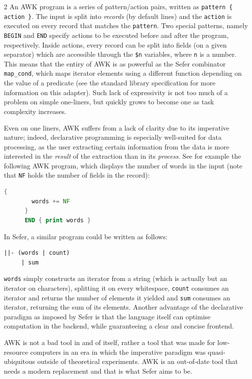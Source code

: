 \begin{multicols*}{2}
  An AWK program is a series of pattern/action pairs, written as
  \verb|pattern { action }|. The input is split into \emph{records}
  (by default lines) and the \verb|action| is executed on every record
  that matches the \verb|pattern|. Two special patterns, namely
  \verb|BEGIN| and \verb|END| specify actions to be executed before
  and after the program, respectively. Inside actions, every record
  can be split into fields (on a given separator) which are accessible
  through the \verb|$n| variables, where \verb|n| is a number. This
  means that the entiry of AWK is as powerful as the Sefer combinator
  \verb|map_cond|, which maps iterator elements using a different
  function depending on the value of a predicate (see the standard
  library specification for more information on this adapter). Such
  lack of expressivity is not too much of a problem on simple
  one-liners, but quickly grows to become one as task complexity
  increases.

  Even on one liners, AWK suffers from a lack of clarity due to its
  imperative nature; indeed, declarative programming is especially
  well-suited for data processing, as the user extracting certain
  information from the data is more interested in the \emph{result} of
  the extraction than in its \emph{process}. See for example the
  following AWK program, which displays the number of words in the
  input (note that \verb|NF| holds the number of fields in the record):
  \begin{lstlisting}[language=Awk,caption={\texttt{wc -w} as an AWK
        program}]
      {
        words += NF
      }
      END { print words }
    \end{lstlisting}

  In Sefer, a similar program could be written as follows:
  \begin{lstlisting}[caption={\texttt{wc -w} as a
        Sefer program}]
    ||- (words | count)
     | sum
  \end{lstlisting}

  \verb|words| simply constructs an iterator from a string (which is
  actually but an iterator on characters), splitting it on every
  whitespace, \verb|count| consumes an iterator and returns the number
  of elements it yielded and \verb|sum| consumes an iterator,
  returning the sum of its elements. Another advantage of the
  declarative paradigm as imposed by Sefer is that the language itself
  can optimise computation in the backend, while guaranteeing a
  clear and concise frontend.

  AWK is not a bad tool in and of itself, rather a tool that was made
  for low-resource computers in an era in which the imperative
  paradigm was quasi-ubiquitous outside of theoretical
  experiments. AWK is an out-of-date tool that needs a modern
  replacement and that is what Sefer aims to be.
\end{multicols*}
